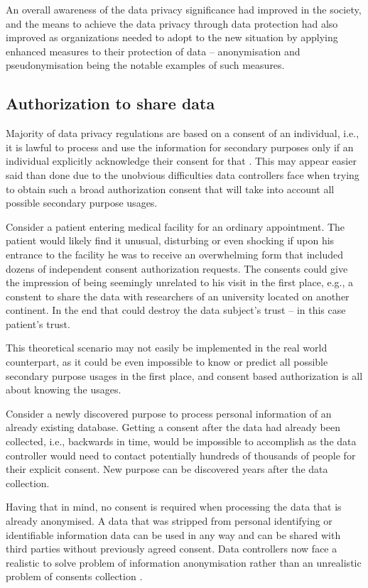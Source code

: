 \documentclass[a4paper,twoside,12pt]{book}
\begin{document}
An overall awareness of the data privacy significance had improved in the society, and the means to achieve the data privacy through data protection had also improved as organizations needed to adopt to the new situation by applying enhanced measures to their protection of data – anonymisation and pseudonymisation being the notable examples of such measures. 

\subsection{Authorization to share data}

Majority of data privacy regulations are based on a consent of an individual, i.e., it is lawful to process and use the information for secondary purposes only if an individual explicitly acknowledge their consent for that \cite{bib:gdpr_practical_guide}. This may appear easier said than done due to the unobvious difficulties data controllers face when trying to obtain such a broad authorization consent that will take into account all possible secondary purpose usages.

Consider a patient entering medical facility for an ordinary appointment. The patient would likely find it unusual, disturbing or even shocking if upon his entrance to the facility he was to receive an overwhelming form that included dozens of independent consent authorization requests. The consents could give the impression of being seemingly unrelated to his visit in the first place, e.g., a constent to share the data with researchers of an university located on another continent. In the end that could destroy the data subject's trust – in this case patient's trust.

This theoretical scenario may not easily be implemented in the real world counterpart, as it could be even impossible to know or predict all possible secondary purpose usages in the first place, and consent based authorization is all about knowing the usages.

Consider a newly discovered purpose to process personal information of an already existing database. Getting a consent after the data had already been collected, i.e., backwards in time, would be impossible to accomplish as the data controller would need to contact potentially hundreds of thousands of people for their explicit consent. New purpose can be discovered years after the data collection.

Having that in mind, no consent is required when processing the data that is already anonymised. A data that was stripped from personal identifying or identifiable information data can be used in any way and can be shared with third parties without previously agreed consent. Data controllers now face a realistic to solve problem of information anonymisation rather than an unrealistic problem of consents collection \cite{bib:anonymizing_health_data}.
\end{document}

